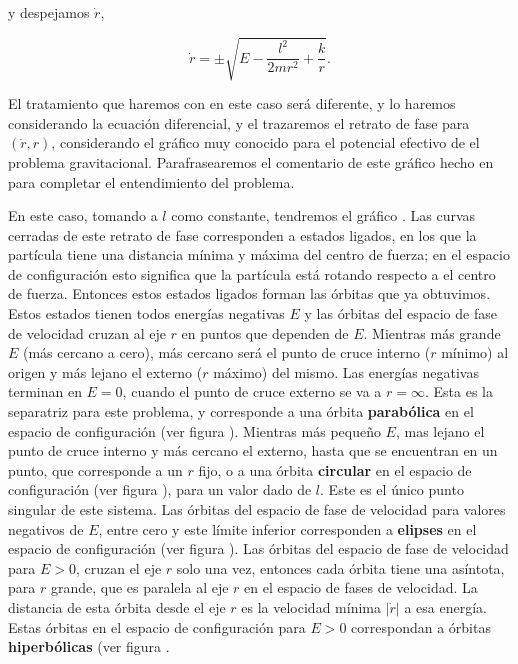 \documentclass[a4paper,10pt]{article}
\numberwithin{equation}{section}
\begin{document}
y despejamos $\dot{r}$,

\begin{equation}
 \dot{r} = \pm \sqrt{E - \frac{l^2}{2mr^2} + \frac{k}{r}}.
\end{equation}

El tratamiento que haremos con en este caso será diferente, y lo haremos considerando 
la ecuación diferencial, y el trazaremos el retrato de fase para $(\dot{r},r)$, considerando
el gráfico muy conocido para el potencial efectivo de el problema gravitacional. Parafrasearemos 
el comentario de este gráfico hecho en \cite{saletan} para completar el entendimiento del
problema.

\vspace{.3cm}

En este caso, tomando a $l$ como constante, tendremos el gráfico . Las 
curvas cerradas de este retrato de fase corresponden a estados ligados, en los que 
la partícula tiene una distancia mínima y máxima del centro de fuerza; en el espacio de
configuración esto significa que la partícula está rotando respecto a el centro de 
fuerza. Entonces estos estados ligados forman las órbitas que ya obtuvimos. Estos 
estados tienen todos energías negativas $E$ y las órbitas del espacio de fase de 
velocidad cruzan al eje $r$ en puntos que dependen de $E$. Mientras más grande $E$ (más 
cercano a cero), más cercano será el punto de cruce interno ($r$ mínimo) al origen y más 
lejano el externo ($r$ máximo) del mismo. Las energías negativas terminan en $E=0$, cuando 
el punto de cruce externo se va a $r=\infty$. Esta es la separatriz para este problema, y 
corresponde a una órbita \textbf{parabólica} en el espacio de configuración (ver figura ).
Mientras más pequeño $E$, mas lejano el punto de cruce interno y más cercano 
el externo, hasta que se encuentran en un punto, que corresponde a un $r$ fijo, 
o a una órbita \textbf{circular} en el espacio de configuración (ver figura ),
para un valor dado de $l$. Este es el único punto singular de este sistema. Las
órbitas del espacio de fase de velocidad para valores negativos de $E$, entre cero 
y este límite inferior corresponden a \textbf{elipses} en el espacio de configuración (ver 
figura ). Las órbitas del espacio de fase de velocidad para $E>0$, 
cruzan el eje $r$ solo una vez, entonces cada órbita tiene una asíntota, para $r$ grande,
que es paralela al eje $r$ en el espacio de fases de velocidad. La distancia de 
esta órbita desde el eje $r$ es la velocidad mínima $|\dot{r}|$ a esa energía. Estas 
órbitas en el espacio de configuración para $E>0$ correspondan a órbitas \textbf{hiperbólicas}
(ver figura .
\end{document}

